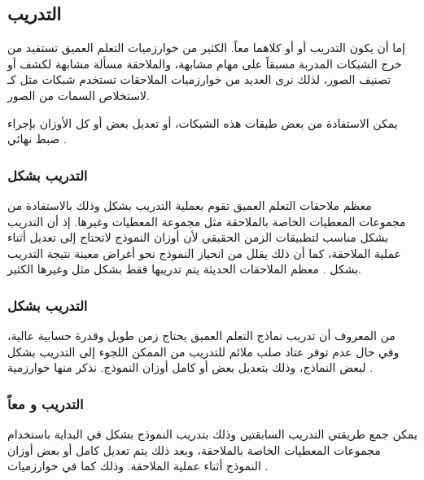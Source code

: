 \subsection{التدريب}
إما أن يكون التدريب 
أو
 أو كلاهما معاً.
 الكثير من خوارزميات التعلم العميق تستفيد من خرج الشبكات المدربة مسبقاً على مهام مشابهة، والملاحقة مسألة مشابهة لكشف أو تصنيف الصور، لذلك نرى العديد من خوارزميات الملاحقات تستخدم شبكات مثل 
كـ
لاستخلاص السمات من الصور.


يمكن الاستفادة من بعض طبقات هذه الشبكات، أو تعديل بعض أو كل الأوزان بإجراء ضبط نهائي
.
\subsubsection{
التدريب بشكل
}
معظم ملاحقات التعلم العميق تقوم بعملية التدريب بشكل
وذلك بالاستفادة من مجموعات المعطيات الخاصة بالملاحقة مثل مجموعة المعطيات
وغيرها.
إذ أن التدريب بشكل  
مناسب لتطبيقات الزمن الحقيقي لأن أوزان النموذج لاتحتاج إلى تعديل أثناء عملية الملاحقة، كما أن ذلك يقلل من انحياز النموذج نحو أغراض معينة 
نتيجة التدريب بشكل 
.
معظم الملاحقات الحديثة يتم تدريبها فقط بشكل 
مثل
وغيرها الكثير.
\subsubsection{
التدريب بشكل 
}
من المعروف أن تدريب نماذج التعلم العميق يحتاج زمن طويل وقدرة حسابية عالية، وفي حال عدم توفر عتاد صلب ملائم للتدريب من الممكن اللجوء إلى التدريب بشكل
لبعض النماذج، وذلك بتعديل بعض أو كامل أوزان النموذج.
نذكر منها خوارزمية 
.

\subsubsection{التدريب 
و 
معاً}
يمكن جمع طريقتي التدريب السابقتين وذلك بتدريب النموذج بشكل
في البداية
باستخدام مجموعات المعطيات الخاصة بالملاحقة، وبعد ذلك يتم تعديل كامل أو بعض أوزان النموذج أثناء عملية الملاحقة. وذلك كما في خوارزميات 
.
